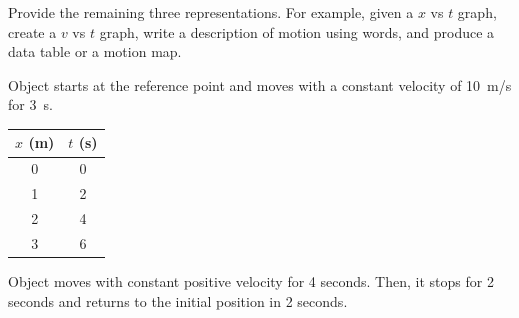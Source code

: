 \documentclass[dvipsnames]{exam}
\begin{document}
\begin{questions}
\begin{EnvUplevel}
    Provide the remaining three representations. For example, given a $x$ vs $t$ graph, create a $v$ vs $t$ graph, write a description of motion using words, and produce a data table or a motion map.
\end{EnvUplevel}

\question \label{wsS8H}
\phantom{.}

\begin{center}
\end{center}

\question
\phantom{.}

\begin{center}
\end{center}

\question
Object starts at the reference point and moves with a constant velocity of \SI{10}{m/s} for \SI{3}{s}.

\question 
\phantom{.}

\begin{tabular}{|c|c|}
    \hline
     $x$ (m) & $t$ (s) \\ \hline
     0 & 0 \\ \hline
     1 & 2 \\ \hline
     2 & 4 \\ \hline
     3 & 6 \\  \hline
\end{tabular}

\question
Object moves with constant positive velocity for 4 seconds.  Then, it stops for 2 seconds and returns to the initial position in 2 seconds.


\end{questions}
\end{document}
